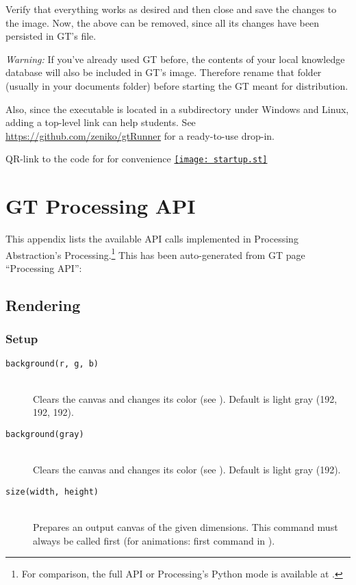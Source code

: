 Verify that everything works as desired and then close and save the changes to the image. Now, the above  can be removed, since all its changes have been persisted in \ac{GT}'s  file.

\emph{Warning:} If you've already used \ac{GT} before, the contents of your local knowledge database will also be included in \ac{GT}'s image. Therefore rename that folder (usually  in your documents folder) before starting the \ac{GT} meant for distribution.

Also, since the executable  is located in a subdirectory under Windows and Linux, adding a top-level link can help students. See \url{https://github.com/zeniko/gtRunner} for a ready-to-use drop-in.

\begin{cfigure}{QR-link to the code for  for convenience}
\href{https://github.com/zeniko/gyminf-thesis/blob/main/appendix.tex}{\texttt{[image: startup.st]}}
\end{cfigure}



\chapter{GT Processing API} \label{app_api}

This appendix lists the available \ac{API} calls implemented in Processing Abstraction's Processing.\footnote{For comparison, the full \ac{API} or Processing's Python mode is available at .} This has been auto-generated from \ac{GT} page ``Processing API'':


\section{Rendering}

\subsection{Setup}
\begin{description}
\item[\texttt{background(r, g, b)}] \hfill \\
	Clears the canvas and changes its color (see ). Default is light gray (192, 192, 192).
\item[\texttt{background(gray)}] \hfill \\
	Clears the canvas and changes its color (see ). Default is light gray (192).
\item[\texttt{size(width, height)}] \hfill \\
	Prepares an output canvas of the given dimensions. This command must always be called first (for animations: first command in ).
\end{description}

